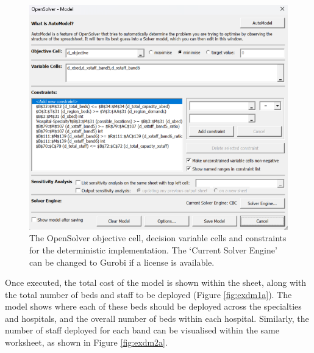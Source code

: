 \documentclass[../thesis.tex]{subfiles}
\begin{document}
\begin{figure}[h!]
    \centering
\includegraphics[width=\textwidth]{Chapters/Chapter7/Figures/DeterministicOS.png}
    \caption{The OpenSolver objective cell, decision variable cells and constraints for the deterministic implementation. The `Current Solver Engine' can be changed to Gurobi if a license is available.}
    \label{fig:exdmos}
\end{figure}
Once executed, the total cost of the model is shown within the sheet, along with the total number of beds and staff to be deployed (Figure \ref{fig:exdm1a}). The model shows where each of these beds should be deployed across the specialties and hospitals, and the overall number of beds within each hospital. Similarly, the number of staff deployed for each band can be visualised within the same worksheet, as shown in Figure \ref{fig:exdm2a}.
\end{document}
